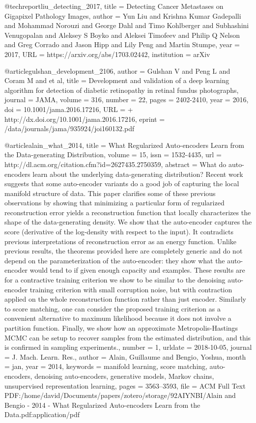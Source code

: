 \documentclass{article}
\begin{document}
@techreport{liu_detecting_2017,
title	= {Detecting Cancer Metastases on Gigapixel Pathology Images},
author	= {Yun Liu and Krishna Kumar Gadepalli and Mohammad Norouzi and George Dahl and Timo Kohlberger and Subhashini Venugopalan and Aleksey S Boyko and Aleksei Timofeev and Philip Q Nelson and Greg Corrado and Jason Hipp and Lily Peng and Martin Stumpe},
year	= {2017},
URL	= {https://arxiv.org/abs/1703.02442},
institution	= {arXiv}
}

@article{gulshan_development_2106,
author = {Gulshan V and Peng L and Coram M and et al},
title = {Development and validation of a deep learning algorithm for detection of diabetic retinopathy in retinal fundus photographs},
journal = {JAMA},
volume = {316},
number = {22},
pages = {2402-2410},
year = {2016},
doi = {10.1001/jama.2016.17216},
URL = { + http://dx.doi.org/10.1001/jama.2016.17216},
eprint = {/data/journals/jama/935924/joi160132.pdf}
}


@article{alain_what_2014,
	title = {What {Regularized} {Auto}-encoders {Learn} from the {Data}-generating {Distribution}},
	volume = {15},
	issn = {1532-4435},
	url = {http://dl.acm.org/citation.cfm?id=2627435.2750359},
	abstract = {What do auto-encoders learn about the underlying data-generating distribution? Recent work suggests that some auto-encoder variants do a good job of capturing the local manifold structure of data. This paper clarifies some of these previous observations by showing that minimizing a particular form of regularized reconstruction error yields a reconstruction function that locally characterizes the shape of the data-generating density. We show that the auto-encoder captures the score (derivative of the log-density with respect to the input). It contradicts previous interpretations of reconstruction error as an energy function. Unlike previous results, the theorems provided here are completely generic and do not depend on the parameterization of the auto-encoder: they show what the auto-encoder would tend to if given enough capacity and examples. These results are for a contractive training criterion we show to be similar to the denoising auto-encoder training criterion with small corruption noise, but with contraction applied on the whole reconstruction function rather than just encoder. Similarly to score matching, one can consider the proposed training criterion as a convenient alternative to maximum likelihood because it does not involve a partition function. Finally, we show how an approximate Metropolis-Hastings MCMC can be setup to recover samples from the estimated distribution, and this is confirmed in sampling experiments.},
	number = {1},
	urldate = {2018-10-05},
	journal = {J. Mach. Learn. Res.},
	author = {Alain, Guillaume and Bengio, Yoshua},
	month = jan,
	year = {2014},
	keywords = {manifold learning, score matching, auto-encoders, denoising auto-encoders, generative models, Markov chains, unsupervised representation learning},
	pages = {3563--3593},
	file = {ACM Full Text PDF:/home/david/Documents/papers/zotero/storage/92AIYNBI/Alain and Bengio - 2014 - What Regularized Auto-encoders Learn from the Data.pdf:application/pdf}
}
\end{document}
